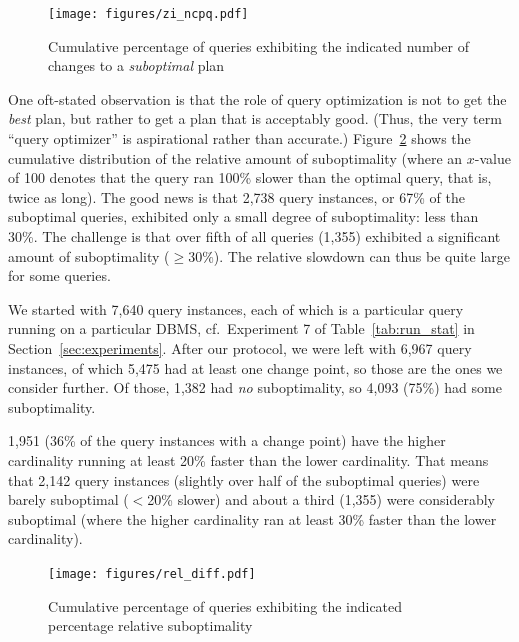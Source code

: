 \documentclass[prodmode,acmtods]{acmsmall}
\begin{document}
\begin{figure}[t]\centering
\texttt{[image: figures/zi\_ncpq.pdf]}
\caption{Cumulative percentage of queries exhibiting the \hbox{indicated}
  number of changes to a {\em suboptimal} plan\label{fig:suboptplanchanges}}
\vspace*{-2ex}
\end{figure}

One oft-stated observation is that the role of query optimization is not to
get the {\em best} plan, but rather to get a plan that is acceptably
good. (Thus, the very term ``query optimizer'' is aspirational rather than
accurate.) Figure~\ref{fig:suboptcumulative} shows
the cumulative distribution of the relative amount of suboptimality (where
an $x$-value of 100 denotes that the query ran 100\% slower than the optimal
query, that is, twice as long). The good news is that 2,738 query instances,
or 67\% of the suboptimal queries, exhibited only a small degree of
suboptimality: less than 30\%. The challenge is that over fifth of all
queries (1,355) exhibited a significant amount of suboptimality ($\geq
30\%$). The relative slowdown can thus be quite large for some queries.

We started with 7,640 query instances, each of which is a particular query running on a
particular DBMS, cf.~Experiment 7 of Table~\ref{tab:run_stat}
in Section~\ref{sec:experiments}. After our protocol, we were left with
  6,967 query instances, of which 5,475 had at least one change point, so those are
  the ones we consider further. Of those, 1,382 had {\em no} suboptimality, so
4,093 (75\%) had some suboptimality. 

1,951 (36\% of the query instances with a change point) have the higher cardinality
running at least 20\% faster than the lower cardinality. That means that
2,142 query instances (slightly over half of the suboptimal queries) were barely
suboptimal ($<$20\% slower) and about a third (1,355) were considerably
suboptimal (where the higher cardinality ran at least 30\% faster than the
lower cardinality).

\begin{figure}\centering
\texttt{[image: figures/rel\_diff.pdf]}
\caption{Cumulative percentage of queries exhibiting the \hbox{indicated}
  percentage relative suboptimality\label{fig:suboptcumulative}}
\end{figure}
\end{document}
